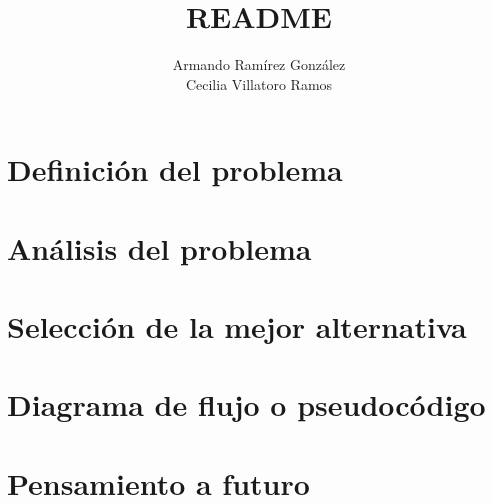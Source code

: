 \documentclass[]{article}
\title{README}
\author{Armando Ramírez González \\ Cecilia Villatoro Ramos}
\begin{document}
\maketitle

\section{Definición del problema}
\section{Análisis del problema}
\section{Selección de la mejor alternativa}
\section{Diagrama de flujo o pseudocódigo}
\section{Pensamiento a futuro}
\end{document}

